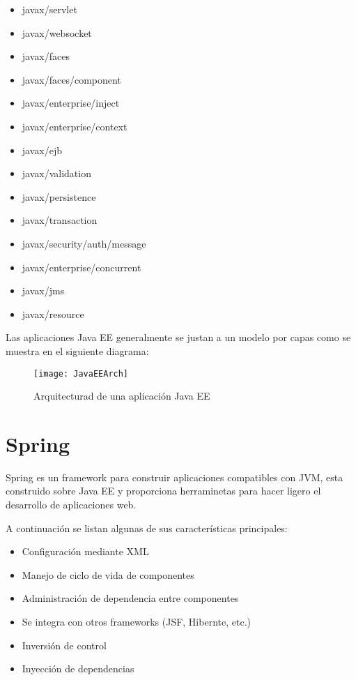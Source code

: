 \begin{itemize}
  \item javax/servlet
  \item javax/websocket
  \item javax/faces
  \item javax/faces/component
  \item javax/enterprise/inject
  \item javax/enterprise/context
  \item javax/ejb
  \item javax/validation
  \item javax/persistence
  \item javax/transaction
  \item javax/security/auth/message
  \item javax/enterprise/concurrent 
  \item javax/jms
  \item javax/resource
\end{itemize}
Las aplicaciones Java EE generalmente se justan a un modelo por capas como se muestra en el siguiente diagrama:
\begin{figure}[H]
  \begin{center}
    \texttt{[image: JavaEEArch]}
  \end{center}
  \caption{Arquitecturad de una aplicación Java EE}
\end{figure}


\section{Spring}
Spring es un framework para construir aplicaciones compatibles con JVM, esta construido sobre Java EE y proporciona herraminetas para hacer ligero el desarrollo de aplicaciones web.

A continuación se listan algunas de sus características principales: 

\begin{itemize}
  \item Configuración mediante XML 
  \item Manejo de ciclo de vida de componentes
  \item Administración de dependencia entre componentes
  \item Se integra con otros frameworks (JSF, Hibernte, etc.)
  \item Inversión de control
  \item Inyección de dependencias 
\end{itemize}

